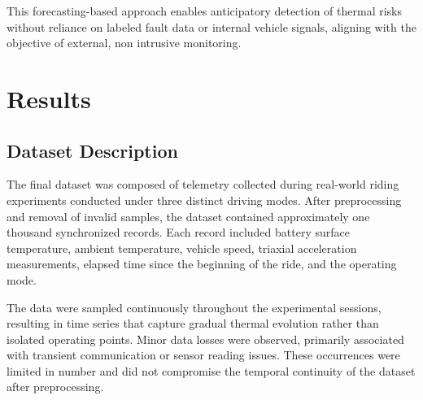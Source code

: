 \documentclass[conference]{IEEEtran}
\begin{document}
This forecasting-based approach enables anticipatory detection of thermal risks without reliance on labeled fault data or internal vehicle signals, aligning with the objective of external, non intrusive monitoring.

\section{Results}

\subsection{Dataset Description}

The final dataset was composed of telemetry collected during real-world riding experiments conducted under three distinct driving modes. After preprocessing and removal of invalid samples, the dataset contained approximately one thousand synchronized records. Each record included battery surface temperature, ambient temperature, vehicle speed, triaxial acceleration measurements, elapsed time since the beginning of the ride, and the operating mode.

\begin{table}[!ht]
\centering
\scriptsize
\caption{Descriptive statistics for the main variables (raw exploratory output).}
\label{tab:desc-stats}
\end{table}

The data were sampled continuously throughout the experimental sessions, resulting in time series that capture gradual thermal evolution rather than isolated operating points. Minor data losses were observed, primarily associated with transient communication or sensor reading issues. These occurrences were limited in number and did not compromise the temporal continuity of the dataset after preprocessing.
\end{document}
